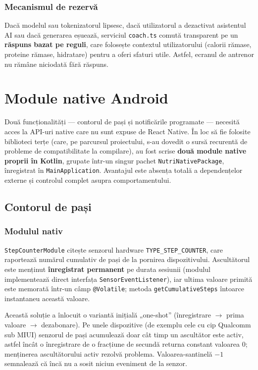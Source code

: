 \documentclass[12pt, a4paper, twoside]{report}
\numberwithin{equation}{section}
\begin{document}
\subsection{Mecanismul de rezervă}

Dacă modelul sau tokenizatorul lipsesc, dacă utilizatorul a dezactivat asistentul AI sau dacă
generarea eșuează, serviciul \texttt{coach.ts} comută transparent pe un \textbf{răspuns bazat
pe reguli}, care folosește contextul utilizatorului (calorii rămase, proteine rămase,
hidratare) pentru a oferi sfaturi utile. Astfel, ecranul de antrenor nu rămâne niciodată fără
răspuns.

\chapter{Module native Android}

Două funcționalități --- contorul de pași și notificările programate --- necesită acces la
API-uri native care nu sunt expuse de React Native. În loc să fie folosite biblioteci terțe
(care, pe parcursul proiectului, s-au dovedit o sursă recurentă de probleme de compatibilitate
la compilare), au fost scrise \textbf{două module native proprii în Kotlin}, grupate într-un
singur pachet \texttt{NutriNativePackage}, înregistrat în \texttt{MainApplication}. Avantajul
este absența totală a dependențelor externe și controlul complet asupra comportamentului.

\section{Contorul de pași}

\subsection{Modulul nativ}

\texttt{StepCounterModule} citește senzorul hardware \texttt{TYPE\_STEP\_COUNTER}, care
raportează numărul cumulativ de pași de la pornirea dispozitivului. Ascultătorul este menținut
\textbf{înregistrat permanent} pe durata sesiunii (modulul implementează direct interfața
\texttt{SensorEventListener}), iar ultima valoare primită este memorată într-un câmp
\texttt{@Volatile}; metoda \texttt{getCumulativeSteps} întoarce instantaneu această valoare.

Această soluție a înlocuit o variantă inițială „one-shot'' (înregistrare $\rightarrow$ prima
valoare $\rightarrow$ dezabonare). Pe unele dispozitive (de exemplu cele cu cip Qualcomm sub
MIUI) senzorul de pași acumulează doar cât timp un ascultător este activ, astfel încât o
înregistrare de o fracțiune de secundă returna constant valoarea $0$; menținerea ascultătorului
activ rezolvă problema. Valoarea-santinelă $-1$ semnalează că încă nu a sosit niciun eveniment
de la senzor.
\end{document}
